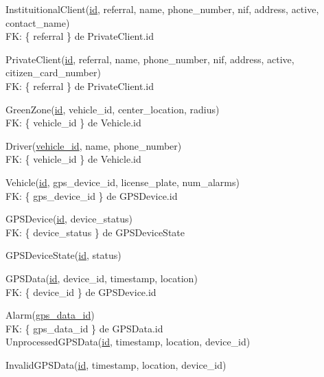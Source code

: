\documentclass[parskip=full]{scrreprt}
\author{André Páscoa A48089}
\date{03/04/2022}
\begin{document}

InstituitionalClient(\underline{id}, referral, name, phone\_number, nif, address, active, contact\_name)\\
FK: \{ referral \} de PrivateClient.id

PrivateClient(\underline{id}, referral, name, phone\_number, nif,
address, active, citizen\_card\_number)\\
FK: \{ referral \} de PrivateClient.id

GreenZone(\underline{id}, vehicle\_id, center\_location, radius)\\
FK: \{ vehicle\_id \} de Vehicle.id

Driver(\underline{vehicle\_id}, name, phone\_number)\\
FK: \{ vehicle\_id \} de Vehicle.id

Vehicle(\underline{id}, gps\_device\_id, license\_plate, num\_alarms)\\
FK: \{ gps\_device\_id \} de GPSDevice.id

GPSDevice(\underline{id}, device\_status)\\
FK: \{ device\_status \} de GPSDeviceState

GPSDeviceState(\underline{id}, status)

GPSData(\underline{id}, device\_id, timestamp, location)\\
FK: \{ device\_id \} de GPSDevice.id

Alarm(\underline{gps\_data\_id})\\
FK: \{ gps\_data\_id \} de GPSData.id\\

UnprocessedGPSData(\underline{id}, timestamp, location, device\_id)

InvalidGPSData(\underline{id}, timestamp, location, device\_id)
\end{document}

